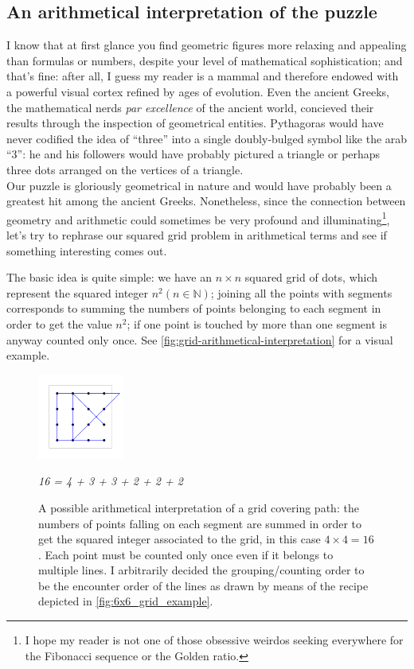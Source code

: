 \documentclass[11pt]{article}
\newcommand{\quotes}[1]{``#1''}
\begin{document}
\hypertarget{arithmetical-interpretation} {
	\subsection{An arithmetical interpretation of the puzzle}
	\label{arithmetical-interpretation}
}
I know that at first glance you find geometric figures more relaxing and appealing than formulas or numbers, despite your level of mathematical sophistication; and that's fine: after all, I guess my reader is a mammal and therefore endowed with a powerful visual cortex refined by ages of evolution. Even the ancient Greeks, the mathematical nerds \emph{par excellence} of the ancient world, concieved their results through the inspection of geometrical entities. Pythagoras would have never codified the idea of \quotes{three} into a single doubly-bulged symbol like the arab \quotes{3}: he and his followers would have probably pictured a triangle or perhaps three dots arranged on the vertices of a triangle.\\
Our puzzle is gloriously geometrical in nature and would have probably been a greatest hit among the ancient Greeks. Nonetheless, since the connection between geometry and arithmetic could sometimes be very profound and illuminating\footnote{I hope my reader is not one of those obsessive weirdos seeking everywhere for the Fibonacci sequence or the Golden ratio.}, let's try to rephrase our squared grid problem in arithmetical terms and see if something interesting comes out.

The basic idea is quite simple: we have an $n\times n$ squared grid of dots, which represent the squared integer $n^{2} (n \in \mathbb{N})$; joining all the points with segments corresponds to summing the numbers of points belonging to each segment in order to get the value $n^2$; if one point is touched by more than one segment is anyway counted only once. See \autoref{fig:grid-arithmetical-interpretation} for a visual example.
\begin{figure}[H]
\centering
\includegraphics[width=0.25\textwidth]{images/4x4_grid_iteration_solution.png}
\caption*{\emph{16 = 4 + 3 + 3 + 2 + 2 + 2}}
\caption{A possible arithmetical interpretation of a grid covering path: the numbers of points falling on each segment are summed in order to get the squared integer associated to the grid, in this case $4\times 4=16$. Each point must be counted only once even if it belongs to multiple lines. I arbitrarily decided the grouping/counting order to be the encounter order of the lines as drawn by means of the recipe depicted in \autoref{fig:6x6_grid_example}.}
\label{fig:grid-arithmetical-interpretation}
\end{figure}
\end{document}
